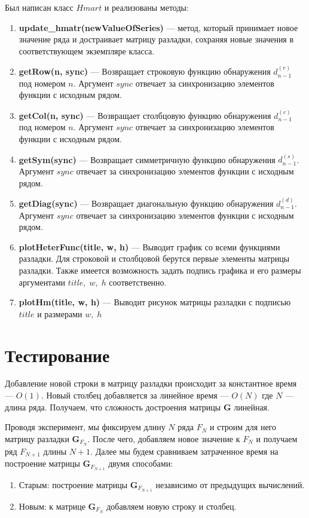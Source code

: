 \documentclass[specialist, substylefile = spbu.rtx,
			   subf, href, 12pt]{disser}
\begin{document}
Был написан класс $Hmart$ и реализованы методы:
\begin{enumerate}
	\item
	\textbf{update\_hmatr(newValueOfSeries)} --- метод, который принимает новое значение ряда и достраивает матрицу разладки, сохраняя новые значения в соответствующем экземпляре класса.
	\item
	\textbf{getRow(n,\; sync)} --- Возвращает строковую функцию обнаружения $d_{n-1}^{(r)}$ под номером $n$. Аргумент $sync$ отвечает за синхронизацию элементов функции с исходным рядом.
	\item
	\textbf{getCol(n,\; sync)} --- Возвращает столбцовую функцию обнаружения $d_{n-1}^{(c)}$ под номером $n$. Аргумент $sync$ отвечает за синхронизацию элементов функции с исходным рядом.
	\item
	\textbf{getSym(sync)} --- Возвращает симметричную функцию обнаружения $d_{n-1}^{(s)}$. Аргумент $sync$ отвечает за синхронизацию элементов функции с исходным рядом.
	\item
	\textbf{getDiag(sync)} --- Возвращает диагональную функцию обнаружения $d_{n-1}^{(d)}$. Аргумент $sync$ отвечает за синхронизацию элементов функции с исходным рядом.
	\item
	\textbf{plotHeterFunc(title,\; w,\; h)} --- Выводит график со всеми функциями разладки. Для строковой и столбцовой берутся первые элементы матрицы разладки. Также имеется возможность задать подпись графика и его размеры аргументами $title,\; w,\; h$ соответственно.
	\item
	\textbf{plotHm(title,\; w,\; h)} --- Выводит рисунок матрицы разладки с подписью $title$ и размерами $w,\; h$
\end{enumerate}

\section{Тестирование}
Добавление новой строки в матрицу разладки происходит за константное время --- $O(1)$. Новый столбец добавляется за линейное время --- $O(N)$ где $N$ --- длина ряда. Получаем, что сложность достроения матрицы $ \mathbf{G} $ линейная. 

Проводя эксперимент, мы фиксируем длину $ N $ ряда $ F_N $ и строим для него матрицу разладки $ \mathbf{G}_{F_N} $. После чего, добавляем новое значение к $ F_N $ и получаем ряд $ F_{N+1} $ длины $ N+1 $. Далее мы будем сравниваем затраченное время на построение матрицы $ \mathbf{G}_{F_{N+1}} $ двумя способами:
\begin{enumerate}
	\item Старым: построение матрицы  $ \mathbf{G}_{F_{N+1}} $ независимо от предыдущих вычислений.
	\item Новым: к матрице $ \mathbf{G}_{F_N} $ добавляем новую строку и столбец.
\end{enumerate}
\end{document}
